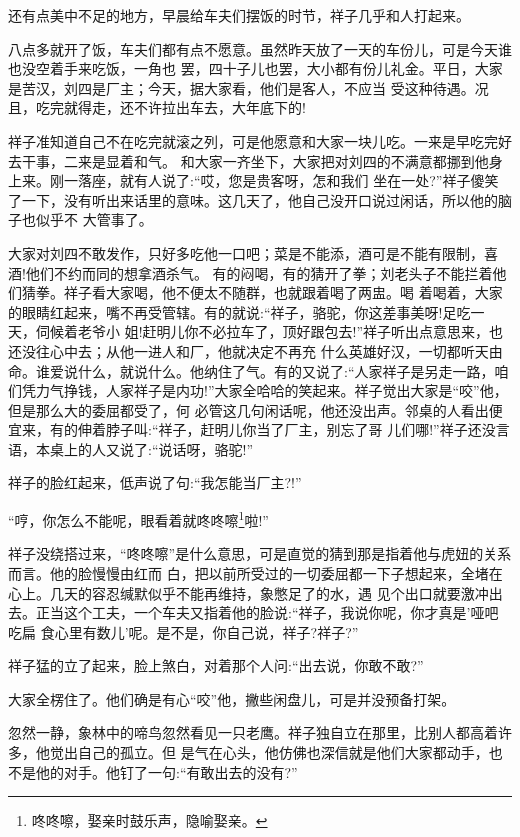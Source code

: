 \documentclass[11pt,a4paper,onecolumn]{article}
\begin{document}
还有点美中不足的地方，早晨给车夫们摆饭的时节，祥子几乎和人打起来。

八点多就开了饭，车夫们都有点不愿意。虽然昨天放了一天的车份儿，可是今天谁也没空着手来吃饭，一角也
罢，四十子儿也罢，大小都有份儿礼金。平日，大家是苦汉，刘四是厂主；今天，据大家看，他们是客人，不应当
受这种待遇。况且，吃完就得走，还不许拉出车去，大年底下的!

祥子准知道自己不在吃完就滚之列，可是他愿意和大家一块儿吃。一来是早吃完好去干事，二来是显着和气。
和大家一齐坐下，大家把对刘四的不满意都挪到他身上来。刚一落座，就有人说了:``哎，您是贵客呀，怎和我们
坐在一处?''祥子傻笑了一下，没有听出来话里的意味。这几天了，他自己没开口说过闲话，所以他的脑子也似乎不
大管事了。

大家对刘四不敢发作，只好多吃他一口吧；菜是不能添，酒可是不能有限制，喜酒!他们不约而同的想拿酒杀气。
有的闷喝，有的猜开了拳；刘老头子不能拦着他们猜拳。祥子看大家喝，他不便太不随群，也就跟着喝了两盅。喝
着喝着，大家的眼睛红起来，嘴不再受管辖。有的就说:``祥子，骆驼，你这差事美呀!足吃一天，伺候着老爷小
姐!赶明儿你不必拉车了，顶好跟包去!''祥子听出点意思来，也还没往心中去；从他一进人和厂，他就决定不再充
什么英雄好汉，一切都听天由命。谁爱说什么，就说什么。他纳住了气。有的又说了:``人家祥子是另走一路，咱
们凭力气挣钱，人家祥子是内功!''大家全哈哈的笑起来。祥子觉出大家是``咬''他，但是那么大的委屈都受了，何
必管这几句闲话呢，他还没出声。邻桌的人看出便宜来，有的伸着脖子叫:``祥子，赶明儿你当了厂主，别忘了哥
儿们哪!''祥子还没言语，本桌上的人又说了:``说话呀，骆驼!''

祥子的脸红起来，低声说了句:``我怎能当厂主?!''

``哼，你怎么不能呢，眼看着就咚咚嚓\footnote{咚咚嚓，娶亲时鼓乐声，隐喻娶亲。}啦!''

祥子没绕搭过来，``咚咚嚓''是什么意思，可是直觉的猜到那是指着他与虎妞的关系而言。他的脸慢慢由红而
白，把以前所受过的一切委屈都一下子想起来，全堵在心上。几天的容忍缄默似乎不能再维持，象憋足了的水，遇
见个出口就要激冲出去。正当这个工夫，一个车夫又指着他的脸说:``祥子，我说你呢，你才真是'哑吧吃扁
食\myrule 心里有数儿'呢。是不是，你自己说，祥子?祥子?''

祥子猛的立了起来，脸上煞白，对着那个人问:``出去说，你敢不敢?''

大家全楞住了。他们确是有心``咬''他，撇些闲盘儿，可是并没预备打架。

忽然一静，象林中的啼鸟忽然看见一只老鹰。祥子独自立在那里，比别人都高着许多，他觉出自己的孤立。但
是气在心头，他仿佛也深信就是他们大家都动手，也不是他的对手。他钉了一句:``有敢出去的没有?''
\end{document}
